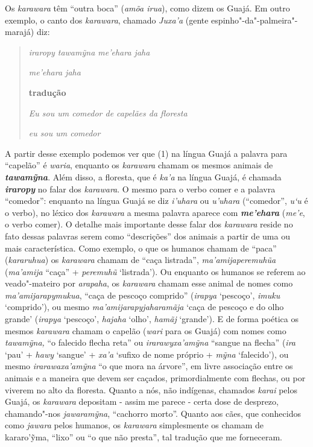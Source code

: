 Os \emph{karawara} têm ``outra boca'' (\emph{amõa irua}), como dizem os
Guajá. Em outro exemplo, o canto dos \emph{karawara}, chamado
\emph{Juxa'a} (gente espinho"-da"-palmeira"-marajá) diz:

\begin{quote}
\emph{iraropy tawamỹna me'ehara jaha }

\emph{me'ehara jaha}

\textbf{tradução}

\emph{Eu sou um comedor de capelães da floresta}

\emph{eu sou um comedor}
\end{quote}

A partir desse exemplo podemos ver que (1) na língua Guajá a palavra
para ``capelão'' é \emph{waria}, enquanto os \emph{karawara} chamam os
mesmos animais de \emph{\textbf{tawamỹna}}. Além disso, a floresta, que
é \emph{ka'a} na língua Guajá, é chamada \emph{\textbf{iraropy}} no
falar dos \emph{karawara}. O mesmo para o verbo comer e a palavra
``comedor'': enquanto na língua Guajá se diz \emph{i'uhara} ou
\emph{u'uhara} (``comedor'', \emph{u`u} é o verbo), no léxico dos
\emph{karawara} a mesma palavra aparece com \emph{\textbf{me'ehara}}
(\emph{me'e}, o verbo comer). O detalhe mais importante desse falar dos
\emph{karawara} reside no fato dessas palavras serem como ``descrições''
dos animais a partir de uma ou mais característica. Como exemplo, o que
os humanos chamam de ``paca'' (\emph{kararuhua}) os \emph{karawara}
chamam de ``caça listrada'', \emph{ma'amijaperemuhũa} (\emph{ma'amija}
``caça'' + \emph{peremuhũ} `listrada'). Ou enquanto os humanos se
referem ao veado"-mateiro por \emph{arapaha}, os \emph{karawara} chamam
esse animal de nomes como \emph{ma'amijarapymukua}, ``caça de pescoço
comprido'' (\emph{irapya} `pescoço', \emph{imuku} `comprido'), ou mesmo
\emph{ma'amijarapyjaharamãja} `caça de pescoço e do olho grande'
(\emph{irapya} `pescoço', \emph{hajaha} `olho', \emph{hamãj} `grande').
E de forma poética os mesmos \emph{karawara} chamam o capelão
(\emph{wari} para os Guajá) com nomes como \emph{tawamỹna,} ``o falecido
flecha reta'' ou \emph{irarawyxa'amỹna} ``sangue na flecha'' (\emph{ira}
`pau' + \emph{hawy} `sangue' + \emph{xa'a} `sufixo de nome próprio +
\emph{mỹna} `falecido'), ou mesmo \emph{irarawaxa'amỹna} ``o que mora na
árvore'', em livre associação entre os animais e a maneira que devem ser
caçados, primordialmente com flechas, ou por viverem no alto da
floresta. Quanto a nós, não indígenas, chamados \emph{karai} pelos
Guajá, os \emph{karawara} depositam - assim me parece - certa dose de
desprezo, chamando"-nos \emph{jawaramỹna}, ``cachorro morto''. Quanto aos
cães, que conhecidos como \emph{jawara} pelos humanos, os
\emph{karawara} simplesmente os chamam de kararo'ỹma, ``lixo'' ou ``o
que não presta'', tal tradução que me forneceram.

